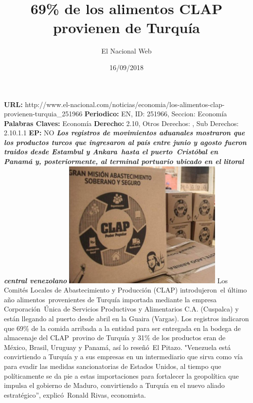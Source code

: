 \documentclass{article}%
\title{\textbf{69\% de los alimentos CLAP provienen de Turquía}}%
\author{El Nacional Web}%
\date{16/09/2018}%
\begin{document}
%
\normalsize%
\maketitle%
\textbf{URL: }%
http://www.el{-}nacional.com/noticias/economia/los{-}alimentos{-}clap{-}provienen{-}turquia\_251966\newline%
%
\textbf{Periodico: }%
EN, %
ID: %
251966, %
Seccion: %
Economía\newline%
%
\textbf{Palabras Claves: }%
Economía\newline%
%
\textbf{Derecho: }%
2.10, %
Otros Derechos: %
, %
Sub Derechos: %
2.10.1.1\newline%
%
\textbf{EP: }%
NO\newline%
\newline%
%
\textbf{\textit{Los registros de movimientos aduanales mostraron que los productos turcos que ingresaron al país entre junio y agosto fueron traidos desde Estambul y Ankara~hasta el puerto~Cristóbal en Panamá y, posteriormente, al terminal portuario ubicado en el litoral central venezolano}}%
\newline%
\newline%
%
\includegraphics[width=300px]{21.jpg}%
\newline%
%
Los Comités Locales de Abastecimiento y Producción (CLAP) introdujeron~el último año alimentos~provenientes de Turquía importada mediante la empresa Corporación~Única de Servicios Productivos y Alimentarios C.A. (Cuspalca) y están llegando al puerto desde abril en la Guaira (Vargas).%
\newline%
%
Los registros indicaron que 69\% de la comida arribada a la entidad para ser entregada en la bodega de almacenaje del CLAP~provino de Turquía y 31\% de los productos eran de México, Brasil, Uruguay y Panamá, así lo reseñó~El Pitazo.%
\newline%
%
"Venezuela está convirtiendo a Turquía y a sus empresas en un intermediario que sirva como vía para evadir las medidas sancionatorias de Estados Unidos, al tiempo que políticamente se da pie a estas importaciones para fortalecer la geopolítica que impulsa el gobierno de Maduro, convirtiendo a Turquía en el nuevo aliado estratégico”, explicó~Ronald Rivas, economista.%
\end{document}
